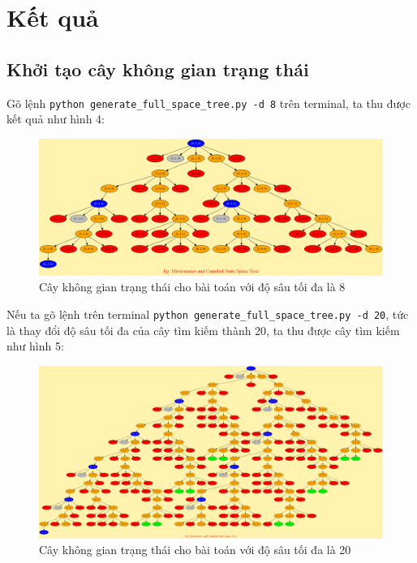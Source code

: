 \documentclass[a4paper, 11pt]{article}
\begin{document}
\section{Kết quả}

\subsection{Khởi tạo cây không gian trạng thái}

Gõ lệnh \lstinline|python generate_full_space_tree.py -d 8| trên terminal, ta thu được kết quả như hình 4:

\begin{figure}[h]
    \centering
    \includegraphics[width=\textwidth,height=\textheight,keepaspectratio]{state_space_8.png}
    \caption{Cây không gian trạng thái cho bài toán với độ sâu tối đa là 8}
\end{figure}

Nếu ta gõ lệnh trên terminal \lstinline|python generate_full_space_tree.py -d 20|, tức là thay đổi độ sâu tối đa của cây tìm kiếm thành 20, ta thu được cây tìm kiếm như hình 5:

\begin{figure}[h]
    \centering
    \includegraphics[width=\textwidth,height=\textheight,keepaspectratio]{state_space_20.png}
    \caption{Cây không gian trạng thái cho bài toán với độ sâu tối đa là 20}
\end{figure}
\end{document}
